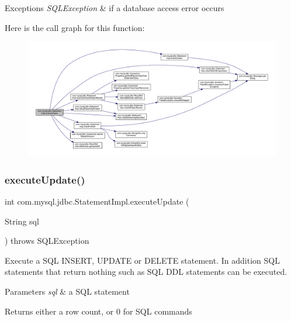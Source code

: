 \begin{DoxyExceptions}{Exceptions}
{\em S\+Q\+L\+Exception} & if a database access error occurs \\
\hline
\end{DoxyExceptions}
Here is the call graph for this function\+:
\nopagebreak
\begin{figure}[H]
\begin{center}
\leavevmode
\includegraphics[width=350pt]{classcom_1_1mysql_1_1jdbc_1_1_statement_impl_a0cec26f8a08e9d8e85b10565d4490b1a_cgraph}
\end{center}
\end{figure}
\mbox{\label{classcom_1_1mysql_1_1jdbc_1_1_statement_impl_aa968966221a50357d4ed7f2d72a94bf6}} 
\subsubsection{\texorpdfstring{execute\+Update()}{executeUpdate()}\hspace{0.1cm}{\footnotesize\ttfamily [1/4]}}
{\footnotesize\ttfamily int com.\+mysql.\+jdbc.\+Statement\+Impl.\+execute\+Update (\begin{DoxyParamCaption}\item[{String}]{sql }\end{DoxyParamCaption}) throws S\+Q\+L\+Exception}

Execute a S\+QL I\+N\+S\+E\+RT, U\+P\+D\+A\+TE or D\+E\+L\+E\+TE statement. In addition S\+QL statements that return nothing such as S\+QL D\+DL statements can be executed.


\begin{DoxyParams}{Parameters}
{\em sql} & a S\+QL statement\\
\hline
\end{DoxyParams}
\begin{DoxyReturn}{Returns}
either a row count, or 0 for S\+QL commands
\end{DoxyReturn}

